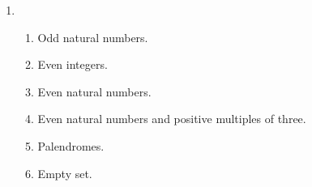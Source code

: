 \documentclass[11pt]{article}
\begin{document}
\begin{enumerate}[0.1]
  \item
  \begin{enumerate}
    \item Odd natural numbers.
    \item Even integers.
    \item Even natural numbers.
    \item Even natural numbers and positive multiples of three.
    \item Palendromes.
    \item Empty set.
  \end{enumerate}
\end{enumerate}
\end{document}
